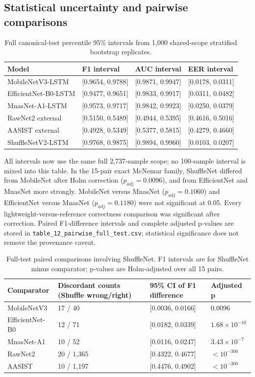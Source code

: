 \documentclass[10pt,journal]{IEEEtran}
\begin{document}
\subsection{Statistical uncertainty and pairwise comparisons}
\begin{table}[htbp]
\centering
\small
\caption{Full canonical-test percentile 95\% intervals from 1,000 shared-scope stratified bootstrap replicates.}
\label{tab:11}
\begin{tabularx}{\textwidth}{lXXX}
\toprule
Model & F1 interval & AUC interval & EER interval \\
\midrule
MobileNetV3-LSTM & [0.9654, 0.9788] & [0.9871, 0.9947] & [0.0178, 0.0311] \\
EfficientNet-B0-LSTM & [0.9477, 0.9651] & [0.9833, 0.9917] & [0.0311, 0.0482] \\
MnasNet-A1-LSTM & [0.9573, 0.9717] & [0.9842, 0.9923] & [0.0250, 0.0379] \\
RawNet2 external & [0.5150, 0.5489] & [0.4944, 0.5395] & [0.4616, 0.5016] \\
AASIST external & [0.4928, 0.5349] & [0.5377, 0.5815] & [0.4279, 0.4660] \\
ShuffleNetV2-LSTM & [0.9768, 0.9875] & [0.9894, 0.9960] & [0.0103, 0.0207] \\
\bottomrule
\end{tabularx}
\end{table}
All intervals now use the same full 2,737-sample scope; no 100-sample interval is mixed into this table. In the 15-pair exact McNemar family, ShuffleNet differed from MobileNet after Holm correction ($p_{adj}=0.0096$), and from EfficientNet and MnasNet more strongly. MobileNet versus MnasNet ($p_{adj}=0.1060$) and EfficientNet versus MnasNet ($p_{adj}=0.1180$) were not significant at 0.05. Every lightweight-versus-reference correctness comparison was significant after correction. Paired F1-difference intervals and complete adjusted p-values are stored in \texttt{table\_12\_pairwise\_full\_test.csv}; statistical significance does not remove the provenance caveat.

\begin{table}[htbp]
\centering
\small
\caption{Full-test paired comparisons involving ShuffleNet. F1 intervals are for ShuffleNet minus comparator; p-values are Holm-adjusted over all 15 pairs.}
\label{tab:12}
\begin{tabularx}{\textwidth}{lXXX}
\toprule
Comparator & Discordant counts (Shuffle wrong/right) & 95\% CI of F1 difference & Adjusted p \\
\midrule
MobileNetV3 & 17 / 40 & [0.0036, 0.0166] & 0.0096 \\
EfficientNet-B0 & 12 / 71 & [0.0182, 0.0339] & $1.68\times10^{-10}$ \\
MnasNet-A1 & 10 / 52 & [0.0116, 0.0247] & $3.43\times10^{-7}$ \\
RawNet2 & 20 / 1,365 & [0.4322, 0.4677] & $<10^{-300}$ \\
AASIST & 10 / 1,197 & [0.4476, 0.4902] & $<10^{-300}$ \\
\bottomrule
\end{tabularx}
\end{table}
\end{document}
